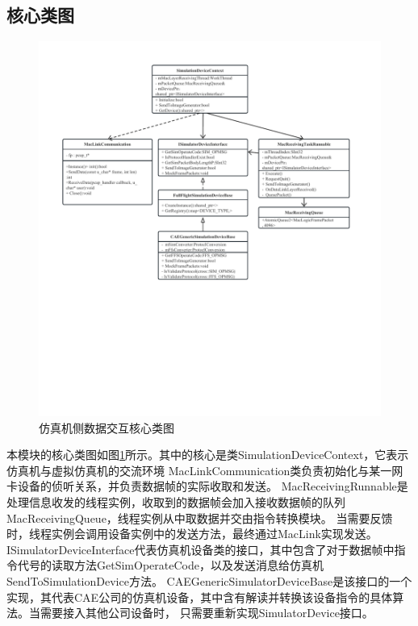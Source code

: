 \subsection{核心类图}
\begin{figure}[h!]
    \begin{center}
        \includegraphics[width=\textwidth]{pictures/classdiagram1.pdf}
        \caption{仿真机侧数据交互核心类图}
        \label{module12}
    \end{center}
\end{figure}
\vspace{7pt}
本模块的核心类图如图\ref{module12}所示。其中的核心是类SimulationDeviceContext，它表示仿真机与虚拟仿真机的交流环境
MacLinkCommunication类负责初始化与某一网卡设备的侦听关系，并负责数据帧的实际收取和发送。
MacReceivingRunnable是处理信息收发的线程实例，收取到的数据帧会加入接收数据帧的队列MacReceivingQueue，线程实例从中取数据并交由指令转换模块。
当需要反馈时，线程实例会调用设备实例中的发送方法，最终通过MacLink实现发送。
ISimulatorDeviceInterface代表仿真机设备类的接口，其中包含了对于数据帧中指令代号的读取方法GetSimOperateCode，以及发送消息给仿真机SendToSimulationDevice方法。
CAEGenericSimulatorDeviceBase是该接口的一个实现，其代表CAE公司的仿真机设备，其中含有解读并转换该设备指令的具体算法。当需要接入其他公司设备时，
只需要重新实现SimulatorDevice接口。

